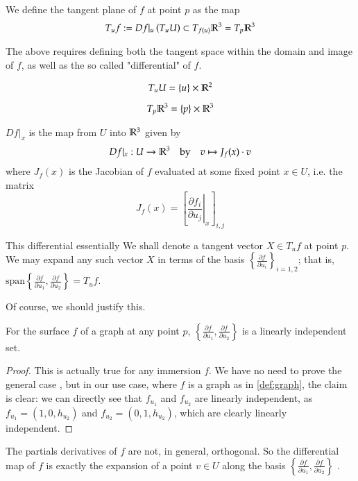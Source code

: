     \begin{defn} \label{def:tangent-plane}
       	
       	We define the tangent plane of $f$ at point $p$ as the map
    \[
    T_u f := Df\vert_u \left(T_u U\right)
	    \subset T_{f(u)} \mathbb{R}^3 = T_{p} \mathbb{R}^3
    \]
\end{defn}
    The above requires defining both the tangent space within the domain and image of $f$, as well as the so called "differential" of $f$.
    
    \begin{defn} \label{def:tangent-at-U}
    	\[ T_{u} U = \left\{u\right\} \times \mathbb{R}^2
    	\]
    	\end{defn}
    \begin{defn}
    	\[ T_{p} \mathbb{R}^3 = \{p\} \times \mathbb{R}^3
    	\]
    \end{defn}
    \begin{defn} \label{def:differential-map}
       	$Df\vert_x$ is the map from $U$ into $\mathbb{R}^3$ given by
    \[
     Df|_x : U \to \mathbb{R}^3 \quad \textrm{by} \quad v \mapsto J_f (x) \cdot v
    \]
where $J_f(x)$ is the Jacobian of $f$ evaluated at some fixed point $x \in U$, i.e. the matrix
\[
J_f (x) = \left[ \left.\frac{\partial f_i}{\partial u_j}\right\vert_x \right]_{i,j}
\]
\end{defn}

This differential essentially 
We shall denote a tangent vector $X \in T_u f$ at point $p$. We may expand any such vector $X$ in terms of the basis $\left\{ \frac{\partial f}{\partial u_i}\right\}_{i=1,2}$; that is,
$\textrm{span}\left\{ \frac{\partial f}{\partial u_1}, \frac{\partial f}{\partial u_2}\right\} = T_u f$. 

Of course, we should justify this.  
\begin{lemma} \label{lemma:f_ui-is-a-basis}
  	For the surface $f$ of a graph at any point $p$, $\left\{\frac{\partial f}{\partial u_1} , \frac{\partial f}{\partial u_2}\right\}$ is a linearly independent set.
\end{lemma}
\begin{proof}
This is actually true for any immersion $f$. We have no need to prove the general case , but
in our use case, where $f$ is a graph as in \cref{def:graph}, the claim is clear: we can directly see that $f_{u_1}$ and $f_{u_2}$ are linearly independent, as $f_{u_1} = (1,0,h_{u_2})$ and $f_{u_2} = (0,1,h_{u_2})$, which are clearly linearly independent. \end{proof}
	The partials derivatives of $f$ are not, in general, orthogonal.
  	So the differential map of $f$ is exactly the expansion of
  	a point  $v \in U$ along the basis
  	$\left\{\frac{\partial f}{\partial u_1} , \frac{\partial f}{\partial u_2}\right\}$ .

